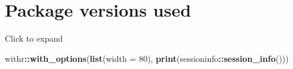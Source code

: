 \documentclass[]{book}
\newenvironment{Shaded}{\begin{snugshade}}{\end{snugshade}}
\newcommand{\DataTypeTok}[1]{\textcolor[rgb]{0.13,0.29,0.53}{#1}}
\newcommand{\DecValTok}[1]{\textcolor[rgb]{0.00,0.00,0.81}{#1}}
\newcommand{\KeywordTok}[1]{\textcolor[rgb]{0.13,0.29,0.53}{\textbf{#1}}}
\newcommand{\NormalTok}[1]{#1}
\newcommand{\OperatorTok}[1]{\textcolor[rgb]{0.81,0.36,0.00}{\textbf{#1}}}
\begin{document}
\hypertarget{package-versions-used}{%
\section*{Package versions used}\label{package-versions-used}}

Click to expand

\begin{Shaded}
\begin{Highlighting}[]
\NormalTok{withr}\OperatorTok{::}\KeywordTok{with_options}\NormalTok{(}\KeywordTok{list}\NormalTok{(}\DataTypeTok{width =} \DecValTok{80}\NormalTok{), }\KeywordTok{print}\NormalTok{(sessioninfo}\OperatorTok{::}\KeywordTok{session_info}\NormalTok{()))}
\end{Highlighting}
\end{Shaded}
\end{document}
